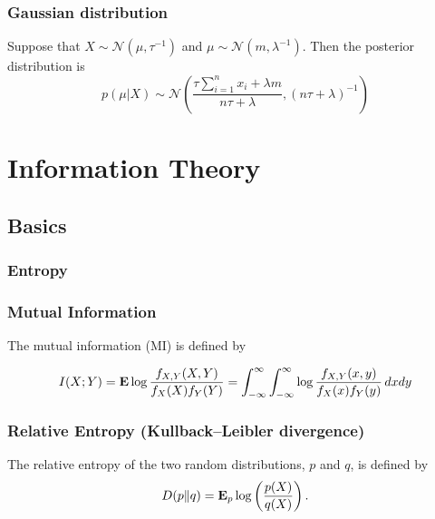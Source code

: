 \subsection{Gaussian distribution}

\newcommand{\gauss}{\mathcal{N}}

Suppose that $X \sim \gauss(\mu, \tau^{-1})$ and $\mu \sim \gauss(m,\lambda^{-1})$.
Then the posterior distribution is
\begin{equation}
p(\mu|X) \sim \gauss\left(
\frac{\tau \sum_{i=1}^n x_i + \lambda m}{n\tau + \lambda},
(n\tau + \lambda)^{-1}
\right)
\end{equation}





\chapter{Information Theory}

\section{Basics}


\subsection{Entropy}

\subsection{Mutual Information}

The mutual information (MI) is defined by

\begin{equation}
I(X;Y) = \mathbf{E} \log \frac{f_{X,Y}(X,Y)}{f_{X}(X)f_{Y}(Y)}
= \int_{-\infty}^{\infty} \int_{-\infty}^{\infty} \log \frac{f_{X,Y}(x,y)}{f_{X}(x)f_{Y}(y)} \, dx dy
\end{equation}


\subsection{Relative Entropy (Kullback–Leibler divergence)}

The relative entropy of the two random distributions, $p$ and $q$, is defined by
\begin{equation}
\label{eq:def-rel-ent}
D(p\|q) = \mathbf{E}_p \log\left(\frac{p(X)}{q(X)}\right).
\end{equation}

